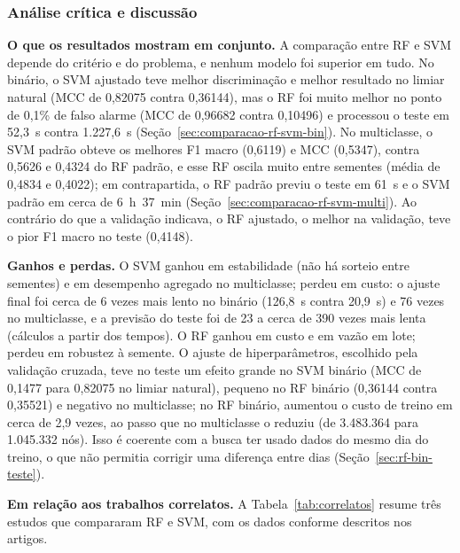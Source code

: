 \documentclass[
    12pt,                %
    openright,           %
    oneside,             %
    a4paper,             %
    english,             %
    brazil               %
]{abntex2}
\begin{document}
\subsubsection{Análise crítica e discussão}

\textbf{O que os resultados mostram em conjunto.} A comparação entre RF e SVM depende do critério e do problema, e nenhum modelo foi superior em tudo. No binário, o SVM ajustado teve melhor discriminação e melhor resultado no limiar natural (MCC de 0,82075 contra 0,36144), mas o RF foi muito melhor no ponto de 0,1\% de falso alarme (MCC de 0,96682 contra 0,10496) e processou o teste em 52,3~s contra 1.227,6~s (Seção~\ref{sec:comparacao-rf-svm-bin}). No multiclasse, o SVM padrão obteve os melhores F1 macro (0,6119) e MCC (0,5347), contra 0,5626 e 0,4324 do RF padrão, e esse RF oscila muito entre sementes (média de 0,4834 e 0,4022); em contrapartida, o RF padrão previu o teste em 61~s e o SVM padrão em cerca de 6~h~37~min (Seção~\ref{sec:comparacao-rf-svm-multi}). Ao contrário do que a validação indicava, o RF ajustado, o melhor na validação, teve o pior F1 macro no teste (0,4148).

\textbf{Ganhos e perdas.} O SVM ganhou em estabilidade (não há sorteio entre sementes) e em desempenho agregado no multiclasse; perdeu em custo: o ajuste final foi cerca de 6 vezes mais lento no binário (126,8~s contra 20,9~s) e 76 vezes no multiclasse, e a previsão do teste foi de 23 a cerca de 390 vezes mais lenta (cálculos a partir dos tempos). O RF ganhou em custo e em vazão em lote; perdeu em robustez à semente. O ajuste de hiperparâmetros, escolhido pela validação cruzada, teve no teste um efeito grande no SVM binário (MCC de 0,1477 para 0,82075 no limiar natural), pequeno no RF binário (0,36144 contra 0,35521) e negativo no multiclasse; no RF binário, aumentou o custo de treino em cerca de 2,9 vezes, ao passo que no multiclasse o reduziu (de 3.483.364 para 1.045.332 nós). Isso é coerente com a busca ter usado dados do mesmo dia do treino, o que não permitia corrigir uma diferença entre dias (Seção~\ref{sec:rf-bin-teste}).

\textbf{Em relação aos trabalhos correlatos.} A Tabela~\ref{tab:correlatos} resume três estudos que compararam RF e SVM, com os dados conforme descritos nos artigos.
\end{document}

